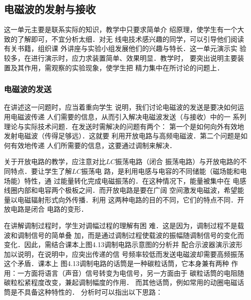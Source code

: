 \subsection{电磁波的发射与接收}

这一单元主要是联系实际的知识，教学中只要求简单介
绍原理，使学生有一个大致的了解即可，不宜分析太细．对无
线电技术感兴趣的同学，可以引导他们阅读有关书籍，组织课
外讲座与实验小组发展他们的兴趣与特长．这一单元演示实
验较多，在进行演示时，应力求装置简单、效果明显．教学时，
要突出说明主要装置及其作用，需观察的实验现象，使学生把
精力集中在所讨论的问题上．

\subsubsection{电磁波的发送}

在讲述这一问题时，应当着重向学生
说明，我们讨论电磁波的发送是要决如何运用电磁波传递
人们需要的信息，从而引入解决电磁波发送（与接收）中的一
系列理论与实际技术问题．在发送时需解决的问题有两个：
第一个是如何向外有效地发射电磁波（传得足够远）．这就要
利用开放电路与高频电磁波．第二个问题是如何有效地传递
人们所需要的信息，这要通过调制来解决．

关于开放电路的教学，应注意对比$LC$振荡电路（闭合
振荡电路）与开放电路的不同特点．要让学生了解$LC$振荡电
路，是利用电感与电容的不同储能（磁场能和电场能）特性，通
过能量转化完成电磁振荡的．在这种情况下，能量被集中在
电感线圈内部和电容两个极板之间．而开放电路是要在广阔
空间激发电磁波，希望能量以电磁辐射形式向外传播．利用
这两种电路的目的不同，它们的特点不同．开放电路是闭合
电路的变形．

在讲解调制过程时，学生对调幅过程的理解有困
难．这是因为，调制过程不是载波和调制信号的简单叠
加，而是通过调制过程使载波的振幅随调制信号的变化而
变化．因此，需结合课本上图4.13调制电路示意图的分析并
配合示波器演示波形加以说明，在说明中，应突出传递的信
号频率较低而发送电磁波却需要高频振荡这个矛盾．课本上
图4.13调制电路的话筒是一种碳粒话筒，它本身兼有两种
作用：一方面将语言（声音）信号转变为电信号，另一方面由于
碳粒话筒的电阻随碳粒松紧程度改变，兼起调制幅度的作用．
而其他话筒，例如常用的动圈电磁话筒是不具备这种特性的．
分析时可以指出以下思路：
\begin{center}
\end{center}

